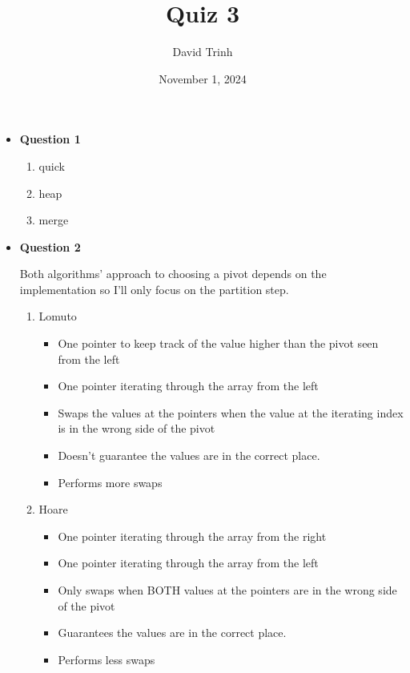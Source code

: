 \documentclass{article}
\title{Quiz 3}
\author{David Trinh}
\date{November 1, 2024}
\begin{document}
\maketitle

\begin{itemize}

    \item\textbf{Question 1}

        \begin{enumerate}
            \item quick
            \item heap
            \item merge
        \end{enumerate}

    \item\textbf{Question 2}

        Both algorithms' approach to choosing a pivot depends on the implementation so I'll only focus on the partition step.

        \begin{enumerate}
            \item Lomuto

                \begin{itemize}
                    \item One pointer to keep track of the value higher than the pivot seen from the left
                    \item One pointer iterating through the array from the left
                    \item Swaps the values at the pointers when the value at the iterating index is in the wrong side of the pivot
                    \item Doesn't guarantee the values are in the correct place.
                    \item Performs more swaps
                \end{itemize}

            \item Hoare

                \begin{itemize}
                    \item One pointer iterating through the array from the right
                    \item One pointer iterating through the array from the left
                    \item Only swaps when BOTH values at the pointers are in the wrong side of the pivot
                    \item Guarantees the values are in the correct place.
                    \item Performs less swaps
                \end{itemize}
                

\end{enumerate}
\end{itemize}
\end{document}
